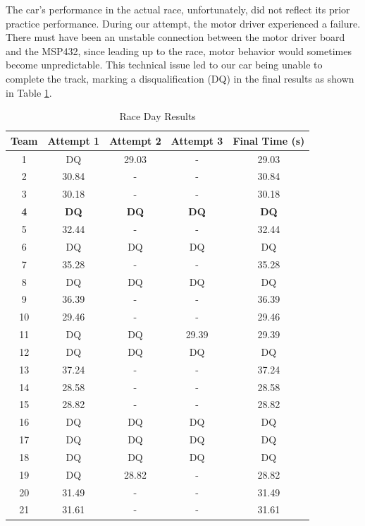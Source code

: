 \documentclass[conference]{IEEEtran}
\begin{document}
The car's performance in the actual race, unfortunately, did not reflect its prior practice performance. During our attempt, the motor driver experienced a failure. There must have been an unstable connection between the motor driver board and the MSP432, since leading up to the race, motor behavior would sometimes become unpredictable. This technical issue led to our car being unable to complete the track, marking a disqualification (DQ) in the final results as shown in Table \ref{tab:raceResults}.

\begin{table}[htbp]
	\caption{Race Day Results}
	\begin{center}
	\begin{tabular}{|c|c|c|c|c|}
		\hline
		\textbf{Team} & \textbf{Attempt 1} & \textbf{Attempt 2} & \textbf{Attempt 3} & \textbf{Final Time (s)} \\
		\hline
		1 & DQ & 29.03 & - & 29.03 \\
		2 & 30.84 & - & - & 30.84 \\
		3 & 30.18 & - & - & 30.18 \\
		\textbf{4} & \textbf{DQ} & \textbf{DQ} & \textbf{DQ} & \textbf{DQ} \\
		5 & 32.44 & - & - & 32.44 \\
		6 & DQ & DQ & DQ & DQ \\
		7 & 35.28 & - & - & 35.28 \\
		8 & DQ & DQ & DQ & DQ \\
		9 & 36.39 & - & - & 36.39 \\
		10 & 29.46 & - & - & 29.46 \\
		11 & DQ & DQ & 29.39 & 29.39 \\
		12 & DQ & DQ & DQ & DQ \\
		13 & 37.24 & - & - & 37.24 \\
		14 & 28.58 & - & - & 28.58 \\
		15 & 28.82 & - & - & 28.82 \\
		16 & DQ & DQ & DQ & DQ \\
		17 & DQ & DQ & DQ & DQ \\
		18 & DQ & DQ & DQ & DQ \\
		19 & DQ & 28.82 & - & 28.82 \\
		20 & 31.49 & - & - & 31.49 \\
		21 & 31.61 & - & - & 31.61 \\

		\hline
	\end{tabular}
	\label{tab:raceResults}
	\end{center}
\end{table}
\end{document}
